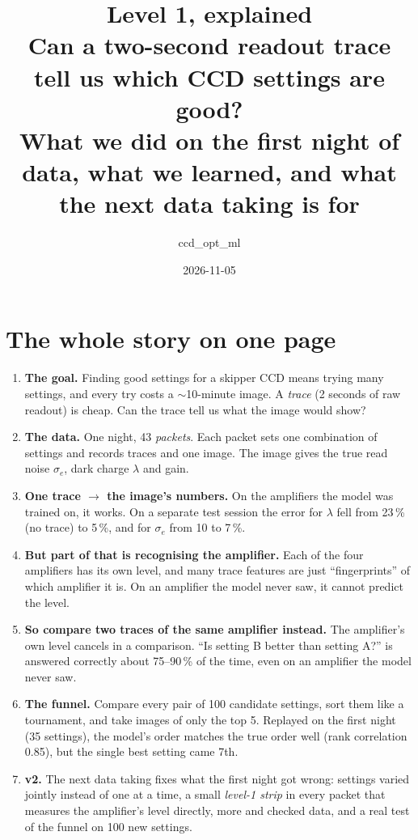 \documentclass[11pt]{article}
\title{\textbf{Level 1, explained}\\[4pt]\large Can a two-second readout trace tell us which CCD settings are good?\\
What we did on the first night of data, what we learned, and what the next data taking is for}
\author{ccd\_opt\_ml}
\date{2026-11-05}
\begin{document}
\maketitle
\thispagestyle{empty}

\section*{The whole story on one page}

\begin{enumerate}[leftmargin=1.4em]
\item \textbf{The goal.} Finding good settings for a skipper CCD means trying many settings, and every try costs a
  $\sim$10-minute image. A \emph{trace} (2 seconds of raw readout) is cheap. Can the trace tell us what the image would
  show?
\item \textbf{The data.} One night, 43 \emph{packets}. Each packet sets one combination of settings and records traces
  and one image. The image gives the true read noise $\sigma_e$, dark charge $\lambda$ and gain.
\item \textbf{One trace $\to$ the image's numbers.} On the amplifiers the model was trained on, it works. On a separate
  test session the error for $\lambda$ fell from 23\,\% (no trace) to 5\,\%, and for $\sigma_e$ from 10 to 7\,\%.
\item \textbf{But part of that is recognising the amplifier.} Each of the four amplifiers has its own level, and many
  trace features are just ``fingerprints'' of which amplifier it is. On an amplifier the model never saw, it cannot
  predict the level.
\item \textbf{So compare two traces of the same amplifier instead.} The amplifier's own level cancels in a comparison.
  ``Is setting B better than setting A?'' is answered correctly about 75--90\,\% of the time, even on an amplifier the
  model never saw.
\item \textbf{The funnel.} Compare every pair of 100 candidate settings, sort them like a tournament, and take images
  of only the top 5. Replayed on the first night (35 settings), the model's order matches the true order well
  (rank correlation 0.85), but the single best setting came 7th.
\item \textbf{v2.} The next data taking fixes what the first night got wrong: settings varied jointly instead of one at
  a time, a small \emph{level-1 strip} in every packet that measures the amplifier's level directly, more and checked
  data, and a real test of the funnel on 100 new settings.
\end{enumerate}
\end{document}
